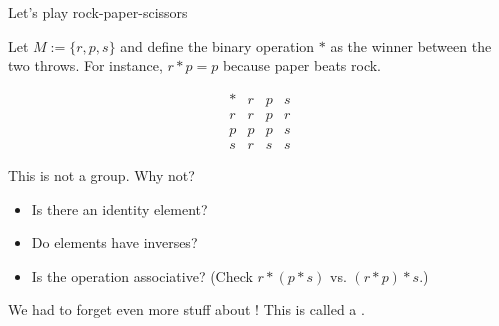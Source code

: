 \documentclass[8pt, handout]{beamer}
\begin{document}

\begin{frame}{Let's play rock-paper-scissors} 

  Let $M := \{r, p, s\}$ and define the binary operation $\ast$ as the winner between the two throws. For instance, $r\ast p = p$ because paper beats rock.

  \medskip \pause

  \[
    \begin{array}{c|ccc}
      \ast & r & p & s \\\hline
         r & r & p & r\\
         p & p & p & s\\
         s & r & s & s     
    \end{array}
  \]

  \medskip \pause

  This is not a group. Why not? \pause
  \begin{itemize}
    \item Is there an identity element? 
    \item Do elements have inverses?
    \item Is the operation associative? (Check $r\ast(p \ast s)$ vs. $(r\ast p)\ast s$.)
  \end{itemize} \pause

  \medskip

  We had to forget even more stuff about  ! This is called a .
  
\end{frame}

\end{document}
